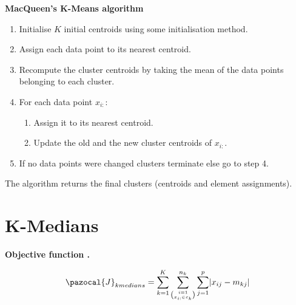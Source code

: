 \documentclass[12pt]{article}
\renewcommand\cite{\citep}  %
\DeclarePairedDelimiter{\abs}{\lvert}{\rvert} %
\newcommand{\CJ}{\pazocal{J}}
\begin{document}
\begin{center}
	\begin{tcolorbox}[breakable,colback=white!100!white,colframe=black!100!black]
		\noindent\textbf{MacQueen's K-Means algorithm}
		\begin{enumerate}
			\item Initialise $K$ initial centroids using some initialisation method. 
			
			\item Assign each data point to its nearest centroid. 
			
			\item Recompute the cluster centroids by taking the mean of the data points belonging to each cluster.
			
			\item For each data point $x_{i:}$:
			
			\begin{enumerate}
				\item Assign it to its nearest centroid.
				\item Update the old and the new cluster centroids of $x_{i:}$.
			\end{enumerate}
			
			\item If no data points were changed clusters terminate else go to step 4.
			
		\end{enumerate}	
		The algorithm returns the final clusters (centroids and element assignments).
	\end{tcolorbox}
\end{center}

\cleardoublepage


\section{K-Medians}

\noindent \textbf{Objective function \cite{aggarwal2014data}.}

\begin{align}\label{kmed1}
\CJ_{kmedians} = \sum_{k=1}^{K}\sum_{\binom{i=1}{x_{i:} \in c_k}}^{n_k} \sum_{j=1}^{p} \abs{x_{ij}-m_{kj}}
\end{align}	
\end{document}
